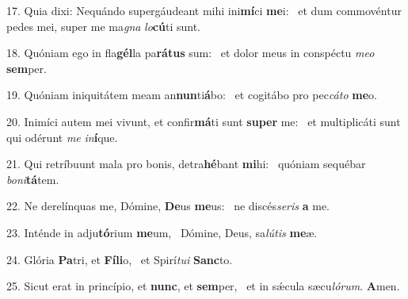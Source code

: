 17. Quia dixi: Nequándo supergáudeant mihi ini\textbf{mí}ci \textbf{me}i: \ast\  et dum commovéntur pedes mei, super me ma\textit{gna} \textit{lo}\textbf{cú}ti sunt.\

18. Quóniam ego in fla\textbf{gél}la pa\textbf{rá}\textbf{tus} sum: \ast\  et dolor meus in conspéctu \textit{me}\textit{o} \textbf{sem}per.\

19. Quóniam iniquitátem meam an\textbf{nun}ti\textbf{á}bo: \ast\  et cogitábo pro pec\textit{cá}\textit{to} \textbf{me}o.\

20. Inimíci autem mei vivunt, et confir\textbf{má}ti sunt \textbf{su}\textbf{per} me: \ast\  et multiplicáti sunt qui odérunt \textit{me} \textit{in}\textbf{í}que.\

21. Qui retríbuunt mala pro bonis, detra\textbf{hé}bant \textbf{mi}hi: \ast\  quóniam sequébar \textit{bo}\textit{ni}\textbf{tá}tem.\

22. Ne derelínquas me, Dómine, \textbf{De}us \textbf{me}us: \ast\  ne discés\textit{se}\textit{ris} \textbf{a} me.\

23. Inténde in adju\textbf{tó}rium \textbf{me}um, \ast\  Dómine, Deus, sa\textit{lú}\textit{tis} \textbf{me}æ.\

24. Glória \textbf{Pa}tri, et \textbf{Fí}\textbf{li}o, \ast\  et Spirí\textit{tu}\textit{i} \textbf{Sanc}to.\

25. Sicut erat in princípio, et \textbf{nunc}, et \textbf{sem}per, \ast\  et in sǽcula sæcu\textit{ló}\textit{rum}. \textbf{A}men.\

